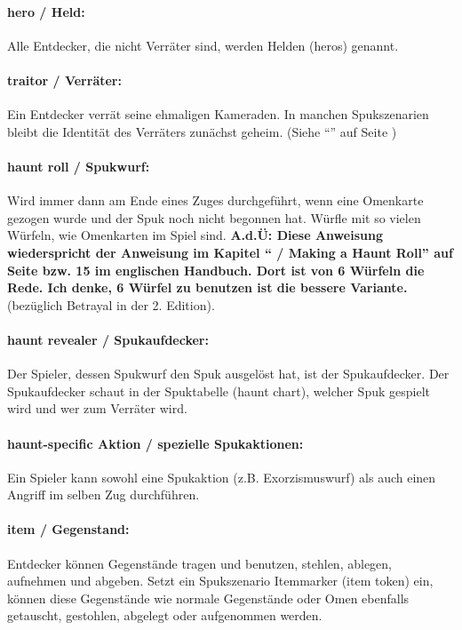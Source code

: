 \paragraph{hero / Held:} Alle Entdecker, die nicht Verräter sind, werden Helden (heros) genannt.

\paragraph{traitor / Verräter:} Ein Entdecker verrät seine ehmaligen Kameraden. In manchen Spukszenarien bleibt die Identität des Verräters zunächst geheim. (Siehe ``'' auf Seite \pageref{kap:rule:hiddentraitor})


\paragraph{haunt roll / Spukwurf:} Wird immer dann am Ende eines Zuges durchgeführt, wenn eine Omenkarte gezogen wurde und der Spuk noch nicht begonnen hat. Würfle mit so vielen Würfeln, wie Omenkarten im Spiel sind. \textbf{A.d.Ü: Diese Anweisung wiederspricht der Anweisung im Kapitel `` / Making a Haunt Roll'' auf Seite \pageref{kap:rule:makehauntroll} bzw. 15 im englischen Handbuch. Dort ist von 6 Würfeln die Rede. Ich denke, 6 Würfel zu benutzen ist die bessere Variante.} (bezüglich Betrayal in der 2. Edition).

\paragraph{haunt revealer / Spukaufdecker:} Der Spieler, dessen Spukwurf den Spuk ausgelöst hat, ist der Spukaufdecker. Der Spukaufdecker schaut in der Spuktabelle (haunt chart), welcher Spuk gespielt wird und wer zum Verräter wird.

\paragraph{haunt-specific Aktion / spezielle Spukaktionen:} Ein Spieler kann sowohl eine Spukaktion (z.B. Exorzismuswurf) als auch einen Angriff im selben Zug durchführen.

\paragraph{item / Gegenstand:} Entdecker können Gegenstände tragen und benutzen, stehlen, ablegen, aufnehmen und abgeben. Setzt ein Spukszenario Itemmarker (item token) ein, können diese Gegenstände wie normale Gegenstände oder Omen ebenfalls getauscht, gestohlen, abgelegt oder aufgenommen werden.

